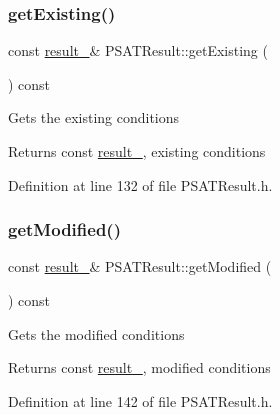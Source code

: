 \subsubsection{\texorpdfstring{get\+Existing()}{getExisting()}\hspace{0.1cm}{\footnotesize\ttfamily [3/3]}}
{\footnotesize\ttfamily const \hyperlink{struct_p_s_a_t_result_1_1result__}{result\+\_\+}\& P\+S\+A\+T\+Result\+::get\+Existing (\begin{DoxyParamCaption}{ }\end{DoxyParamCaption}) const\hspace{0.3cm}{\ttfamily [inline]}}

Gets the existing conditions

\begin{DoxyReturn}{Returns}
const \hyperlink{struct_p_s_a_t_result_1_1result__}{result\+\_\+}, existing conditions 
\end{DoxyReturn}


Definition at line 132 of file P\+S\+A\+T\+Result.\+h.

\mbox{\label{class_p_s_a_t_result_ae43bb3b001e2746292d0dd0d6cebcfdd}} 
\subsubsection{\texorpdfstring{get\+Modified()}{getModified()}\hspace{0.1cm}{\footnotesize\ttfamily [1/3]}}
{\footnotesize\ttfamily const \hyperlink{struct_p_s_a_t_result_1_1result__}{result\+\_\+}\& P\+S\+A\+T\+Result\+::get\+Modified (\begin{DoxyParamCaption}{ }\end{DoxyParamCaption}) const\hspace{0.3cm}{\ttfamily [inline]}}

Gets the modified conditions

\begin{DoxyReturn}{Returns}
const \hyperlink{struct_p_s_a_t_result_1_1result__}{result\+\_\+}, modified conditions 
\end{DoxyReturn}


Definition at line 142 of file P\+S\+A\+T\+Result.\+h.

\mbox{\label{class_p_s_a_t_result_ae43bb3b001e2746292d0dd0d6cebcfdd}} 
